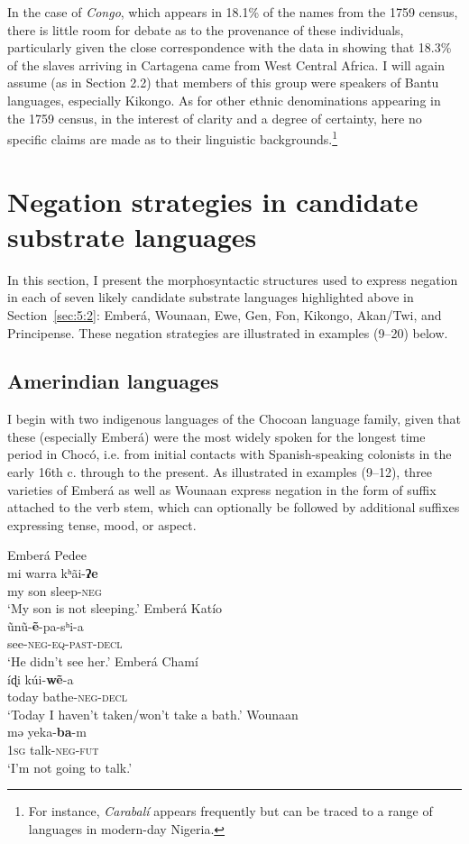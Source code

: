 \documentclass[output=paper,colorlinks,citecolor=brown]{langscibook}
\begin{document}
In the case of \emph{Congo}, which appears in 18.1\% of the names from the 1759 census, there is little room for debate as to the provenance of these individuals, particularly given the close correspondence with the data in  showing that 18.3\% of the slaves arriving in Cartagena came from West Central Africa. I will again assume (as in Section 2.2) that members of this group were speakers of Bantu languages, especially Kikongo. As for other ethnic denominations appearing in the 1759 census, in the interest of clarity and a degree of certainty, here no specific claims are made as to their linguistic backgrounds.\footnote{For instance, \emph{Carabalí} appears frequently but can be traced to a range of languages in modern-day Nigeria.}


\section{Negation strategies in candidate substrate languages}

In this section, I present the morphosyntactic structures used to express negation in each of seven likely candidate substrate languages highlighted above in Section~\ref{sec:5:2}: Emberá, Wounaan, Ewe, Gen, Fon, Kikongo, Akan/Twi, and Principense. These negation strategies are illustrated in examples (9–20) below. 

\subsection{Amerindian languages}

I begin with two indigenous languages of the Chocoan language family, given that these (especially Emberá) were the most widely spoken for the longest time period in Chocó, i.e. from initial contacts with Spanish-speaking colonists in the early 16th c. through to the present. As illustrated in examples (9–12), three varieties of Emberá as well as Wounaan express negation in the form of suffix attached to the verb stem, which can optionally be followed by additional suffixes expressing tense, mood, or aspect. 

\ea Emberá Pedee \citep[131]{Harms_1994}\\
\gll  mi warra kʰãi-\textbf{ʔe}  \\
      my son sleep-\textsc{neg}  \\
\glt ‘My son is not sleeping.’
\ex Emberá Katío \citep[98]{Mortenson_1999}\\
\gll ũnũ-\textbf{ẽ}-pa-sʰi-a  \\
     see-\textsc{neg}-\textsc{eq}-\textsc{past}-\textsc{decl}\\
\glt ‘He didn’t see her.’
\ex Emberá Chamí \citep[112]{AguirreLicth_1999}\\
\gll íɖi kúi-\textbf{wẽ}-a\\
     today bathe-\textsc{neg}-\textsc{decl}\\
\glt ‘Today I haven’t taken/won’t take a bath.’ 
\ex Wounaan \citep[129]{Holmer_1963}\\
\gll mə yeka-\textbf{ba}-m  \\
     \textsc{1sg} talk-\textsc{neg}-\textsc{fut}  \\
\glt ‘I’m not going to talk.’
\z
\end{document}
